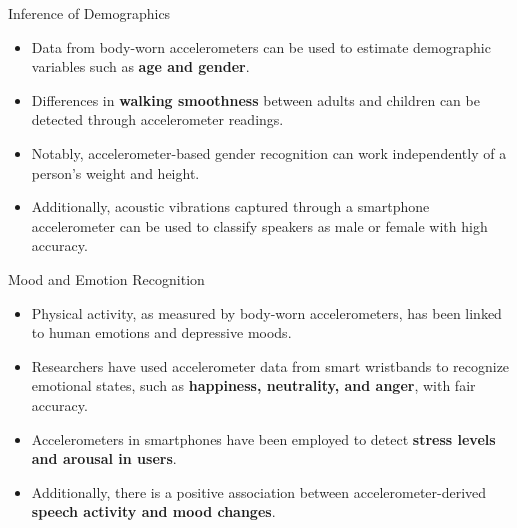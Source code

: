 \documentclass[ucs,9pt,usenames,dvipsnames]{beamer}
\begin{document}
\begin{frame}{Inference of Demographics}
 \begin{itemize}
	\item Data from body-worn accelerometers can be used to estimate demographic variables such as \textbf{age and gender}.  
	\item Differences in \textbf{walking smoothness} between adults and children
	can be detected through accelerometer readings. 
	\item  Notably, accelerometer-based gender recognition can work independently of a person’s weight and height. 
	\item Additionally, acoustic vibrations captured
	through a smartphone accelerometer can be used to classify
	speakers as male or female with high accuracy.
 \end{itemize}
\end{frame}


\begin{frame}{Mood and Emotion Recognition}
	\begin{itemize}
		\item Physical activity, as measured by body-worn accelerometers, has been linked to human emotions and depressive moods. 
		\item Researchers have used accelerometer data from smart
		wristbands to recognize emotional states, such as \textbf{happiness,
		neutrality, and anger}, with fair accuracy.
		\item  Accelerometers in smartphones have been employed to detect \textbf{stress levels and arousal in users}. 
		\item Additionally, there is a positive association between accelerometer-derived \textbf{speech activity and mood changes}.
	\end{itemize}
\end{frame}
\end{document}
